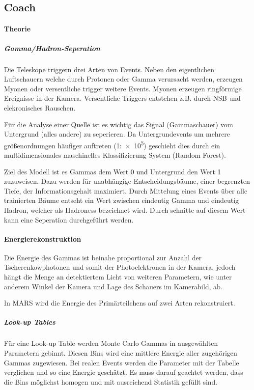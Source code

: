 \subsection{Coach}%
\label{sub:coach}

\paragraph{Theorie}%
\label{par:theorie}

\subparagraph{Gamma/Hadron-Seperation}
Die Teleskope triggern drei Arten von Events. 
Neben den eigentlichen Luftschauern welche durch Protonen 
oder Gamma verursacht werden,
erzeugen Myonen oder versentliche trigger weitere Events.
Myonen erzeugen ringförmige Ereignisse in der Kamera.
Versentliche Triggers entstehen z.B. durch NSB und elekronisches Rauschen.

Für die Analyse einer Quelle ist es wichtig das Signal (Gammaschauer) vom 
Untergrund (alles andere) zu seperieren.
Da Untergrundevents um mehrere größenordnungen häufiger auftreten (1:\num{e5})
geschieht dies durch ein multidimensionales maschinelles Klassifizierung 
System (Random Forest).

Ziel des Modell ist es Gammas dem Wert 0 und Untergrund den Wert 1 zuzuweisen.
Dazu werden für unabhängige Entscheidungsbäume, 
einer begrenzten Tiefe, 
der Informationsgehalt maximiert.
Durch Mittelung eines Events über alle trainierten Bäume entseht ein Wert
zwischen eindeutig Gamma und eindeutig Hadron, welcher als Hadroness bezeichnet
wird.
Durch schnitte auf diesem Wert kann eine Seperation durchgeführt werden.

\paragraph{Energierekonstruktion}%
\label{par:energie}

Die Energie des Gammas ist beinahe proportional
zur Anzahl der Tscherenkowphotonen
und somit der Photoelektronen in der Kamera,
jedoch hängt die Menge an detektiertem Licht von weiteren Parametern,
wie unter anderem Winkel der Kamera und Lage des Schauers im Kamerabild, ab.

In MARS wird die Energie des Primärteilchens auf zwei Arten rekonstruiert.

\subparagraph{Look-up Tables}
Für eine Look-up Table werden Monte Carlo Gammas
in ausgewählten Parametern gebinnt.
Diesen Bins wird eine mittlere Energie aller
zugehörigen Gammas zugewiesen.
Bei realen Events werden die Parameter mit der Tabelle verglichen
und so eine Energie geschätzt.
Es muss darauf geachtet werden,
dass die Bins möglichst homogen und mit ausreichend Statistik gefüllt sind.

